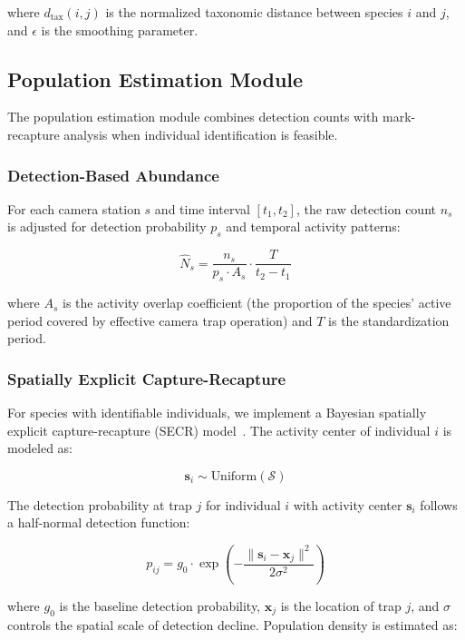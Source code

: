 \documentclass[11pt,letterpaper]{article}
\begin{document}
where $d_{\text{tax}}(i, j)$ is the normalized taxonomic distance between species $i$ and $j$, and $\epsilon$ is the smoothing parameter.

\subsection{Population Estimation Module}

The population estimation module combines detection counts with mark-recapture analysis when individual identification is feasible.

\subsubsection{Detection-Based Abundance}

For each camera station $s$ and time interval $[t_1, t_2]$, the raw detection count $n_s$ is adjusted for detection probability $p_s$ and temporal activity patterns:

\begin{equation}
\hat{N}_s = \frac{n_s}{p_s \cdot A_s} \cdot \frac{T}{t_2 - t_1}
\end{equation}

where $A_s$ is the activity overlap coefficient (the proportion of the species' active period covered by effective camera trap operation) and $T$ is the standardization period.

\subsubsection{Spatially Explicit Capture-Recapture}

For species with identifiable individuals, we implement a Bayesian spatially explicit capture-recapture (SECR) model~\cite{efford2004}. The activity center of individual $i$ is modeled as:

\begin{equation}
\mathbf{s}_i \sim \text{Uniform}(\mathcal{S})
\end{equation}

The detection probability at trap $j$ for individual $i$ with activity center $\mathbf{s}_i$ follows a half-normal detection function:

\begin{equation}
p_{ij} = g_0 \cdot \exp\left(-\frac{\|\mathbf{s}_i - \mathbf{x}_j\|^2}{2\sigma^2}\right)
\end{equation}

where $g_0$ is the baseline detection probability, $\mathbf{x}_j$ is the location of trap $j$, and $\sigma$ controls the spatial scale of detection decline. Population density is estimated as:
\end{document}
